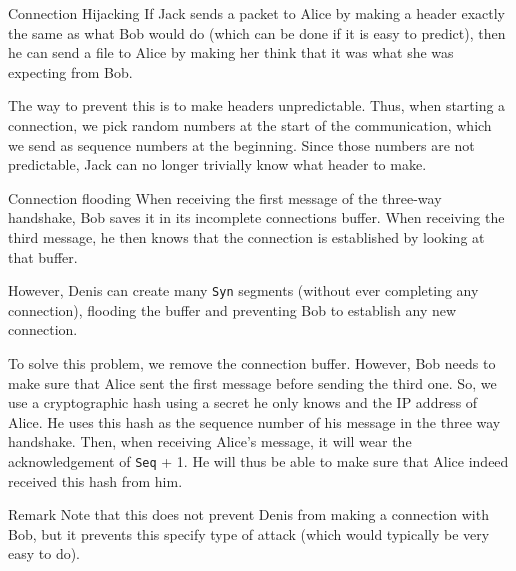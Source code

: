 \documentclass[a4paper]{article}
\begin{document}
\begin{parag}{Connection Hijacking}
    If Jack sends a packet to Alice by making a header exactly the same as what Bob would do (which can be done if it is easy to predict), then he can send a file to Alice by making her think that it was what she was expecting from Bob.

    The way to prevent this is to make headers unpredictable. Thus, when starting a connection, we pick random numbers at the start of the communication, which we send as sequence numbers at the beginning. Since those numbers are not predictable, Jack can no longer trivially know what header to make. 
\end{parag}

\begin{parag}{Connection flooding}
    When receiving the first message of the three-way handshake, Bob saves it in its incomplete connections buffer. When receiving the third message, he then knows that the connection is established by looking at that buffer.

    However, Denis can create many \texttt{Syn} segments (without ever completing any connection), flooding the buffer and preventing Bob to establish any new connection.

    To solve this problem, we remove the connection buffer. However, Bob needs to make sure that Alice sent the first message before sending the third one. So, we use a cryptographic hash using a secret he only knows and the IP address of Alice. He uses this hash as the sequence number of his message in the three way handshake. Then, when receiving Alice's message, it will wear the acknowledgement of \texttt{Seq} + 1. He will thus be able to make sure that Alice indeed received this hash from him.

    \begin{subparag}{Remark}
        Note that this does not prevent Denis from making a connection with Bob, but it prevents this specify type of attack (which would typically be very easy to do).
    \end{subparag}
\end{parag}
\end{document}
